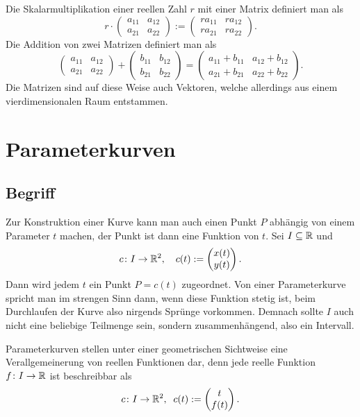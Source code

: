 Die Skalarmultiplikation einer reellen Zahl $r$ mit einer Matrix
definiert man als
\[r\cdot\begin{pmatrix}
a_{11} & a_{12}\\
a_{21} & a_{22}\end{pmatrix}
:= \begin{pmatrix}
ra_{11} & ra_{12}\\
ra_{21} & ra_{22}\end{pmatrix}.\]
Die Addition von zwei Matrizen definiert man als
\[\begin{pmatrix}
a_{11} & a_{12}\\
a_{21} & a_{22}
\end{pmatrix} + \begin{pmatrix}
b_{11} & b_{12}\\
b_{21} & b_{22}
\end{pmatrix} = \begin{pmatrix}
a_{11}+b_{11} & a_{12}+b_{12}\\
a_{21}+b_{21} & a_{22}+b_{22}
\end{pmatrix}.\]
Die Matrizen sind auf diese Weise auch Vektoren, welche allerdings
aus einem vierdimensionalen Raum entstammen. 

\section{Parameterkurven}
\subsection{Begriff}
Zur Konstruktion einer Kurve kann man auch einen Punkt $P$ abhängig
von einem Parameter $t$ machen, der Punkt ist dann eine Funktion
von $t$. Sei $I\subseteq\mathbb R$ und%
\[c\colon I\to\mathbb R^2, \quad c(t):=\begin{pmatrix}x(t)\\ y(t)\end{pmatrix}.\]
Dann wird jedem $t$ ein Punkt $P=c(t)$ zugeordnet. Von einer
Parameterkurve spricht man im strengen Sinn dann, wenn diese
Funktion stetig ist, beim Durchlaufen der Kurve also nirgends
Sprünge vorkommen. Demnach sollte $I$ auch nicht eine beliebige
Teilmenge sein, sondern zusammenhängend, also ein Intervall.

Parameterkurven stellen unter einer geometrischen Sichtweise eine
Verallgemeinerung von reellen Funktionen dar, denn jede reelle
Funktion $f\colon I\to\mathbb R$ ist beschreibbar als%
\[c\colon I\to \mathbb R^2,\;\; c(t):=\begin{pmatrix}t\\ f(t)\end{pmatrix}.\]

